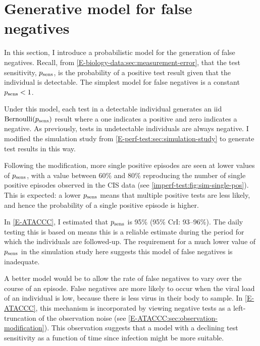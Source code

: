 \documentclass[thesis.tex]{subfiles}
\begin{document}
\section{Generative model for false negatives} \label{imperf-test:sec:simulate}

In this section, I introduce a probabilistic model for the generation of false negatives.
Recall, from \cref{E-biology-data:sec:measurement-error}, that the test sensitivity, $p_\text{sens}$, is the probability of a positive test result given that the individual is detectable.
The simplest model for false negatives is a constant $p_\text{sens} < 1$.

Under this model, each test in a detectable individual generates an iid $\operatorname{Bernoulli}(p_\text{sens})$ result where a one indicates a positive and zero indicates a negative.
As previously, tests in undetectable individuals are always negative.
I modified the simulation study from \cref{E-perf-test:sec:simulation-study} to generate test results in this way.

Following the modification, more single positive episodes are seen at lower values of $p_\text{sens}$, with a value between 60\% and 80\% reproducing the number of single positive episodes observed in the CIS data (see \cref{imperf-test:fig:sim-single-pos}).
This is expected: a lower $p_\text{sens}$ means that multiple positive tests are less likely, and hence the probability of a single positive episode is higher.

In \cref{E-ATACCC}, I estimated that $p_\text{sens}$ is 95\% (95\% CrI: 93--96\%).
The daily testing this is based on means this is a reliable estimate during the period for which the individuals are followed-up.
The requirement for a much lower value of $p_\text{sens}$ in the simulation study here suggests this model of false negatives is inadequate.

A better model would be to allow the rate of false negatives to vary over the course of an episode.
False negatives are more likely to occur when the viral load of an individual is low, because there is less virus in their body to sample.
In \cref{E-ATACCC}, this mechanism is incorporated by viewing negative tests as a left-truncation of the observation noise (see \cref{E-ATACCC:sec:observation-modification}).
This observation suggests that a model with a declining test sensitivity as a function of time since infection might be more suitable.
\end{document}
